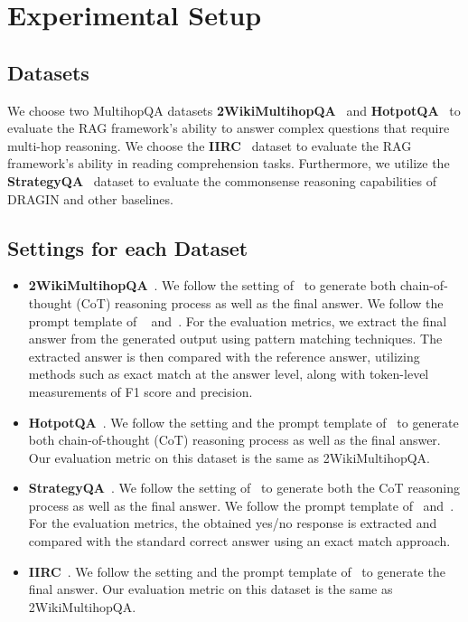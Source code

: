 \section{Experimental Setup}

\subsection{Datasets}

We choose two MultihopQA datasets \textbf{2WikiMultihopQA}~\cite{ho2020constructing} and \textbf{HotpotQA}~\cite{yang2018hotpotqa} to evaluate the RAG framework's ability to answer complex questions that require multi-hop reasoning. We choose the \textbf{IIRC}~\cite{ferguson2020iirc} dataset to evaluate the RAG framework's ability in reading comprehension tasks. Furthermore, we utilize the \textbf{StrategyQA}~\cite{geva2021did} dataset to evaluate the commonsense reasoning capabilities of DRAGIN and other baselines. 

\subsection{Settings for each Dataset}
\label{sec:setting}

\begin{itemize}[leftmargin=*]

    \item \textbf{2WikiMultihopQA}~\cite{ho2020constructing}. We follow the setting of~\cite{wang2022self} to generate both chain-of-thought (CoT) reasoning process as well as the final answer. We follow the prompt template of ~\cite{trivedi2022interleaving} and~\cite{jiang2023active}. 
    For the evaluation metrics, we extract the final answer from the generated output using pattern matching techniques. The extracted answer is then compared with the reference answer, utilizing methods such as exact match at the answer level, along with token-level measurements of F1 score and precision.

    \item \textbf{HotpotQA}~\cite{yang2018hotpotqa}. We follow the setting and the prompt template of~\cite{trivedi2022interleaving} to generate both chain-of-thought (CoT) reasoning process as well as the final answer. Our evaluation metric on this dataset is the same as 2WikiMultihopQA.

    \item \textbf{StrategyQA}~\cite{geva2021did}. We follow the setting of~\cite{wei2022chain} to generate both the CoT reasoning process as well as the final answer. We follow the prompt template of~\cite{wei2022chain} and~\cite{jiang2023active}. 
    For the evaluation metrics, the obtained yes/no response is extracted and compared with the standard correct answer using an exact match approach.

    \item \textbf{IIRC}~\cite{ferguson2020iirc}. We follow the setting and the prompt template of~\cite{trivedi2022interleaving} to generate the final answer. Our evaluation metric on this dataset is the same as 2WikiMultihopQA.
\end{itemize}

